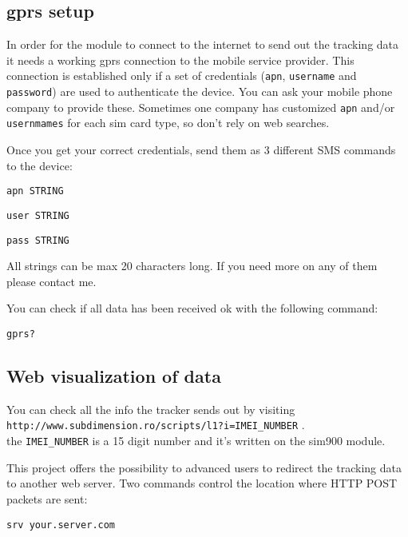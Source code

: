 \documentclass[a4paper,twoside]{refart}
\begin{document}
\subsection{gprs setup}

In order for the module to connect to the internet to send out the tracking data it needs a working gprs connection to the mobile service provider. This connection is established only if a set of credentials (\verb"apn", \verb"username" and \verb"password") are used to authenticate the device. You can ask your mobile phone company to provide these. Sometimes one company has customized \verb"apn" and/or \verb"usernmames" for each sim card type, so don't rely on web searches.

Once you get your correct credentials, send them as 3 different SMS commands to the device:

\begin{lstlisting}
apn STRING
\end{lstlisting}
\begin{lstlisting}
user STRING
\end{lstlisting}
\begin{lstlisting}
pass STRING
\end{lstlisting}

 All strings can be max 20 characters long. If you need more on any of them please contact me.

You can check if all data has been received ok with the following command:

\begin{lstlisting}
gprs?
\end{lstlisting}


\subsection{Web visualization of data}

You can check all the info the tracker sends out by visiting \\ \verb"http://www.subdimension.ro/scripts/l1?i=IMEI_NUMBER" .\\
the \verb"IMEI_NUMBER" is a 15 digit number and it's written on the sim900 module.

This project offers the possibility to advanced users to redirect the tracking data to another web server.
Two commands control the location where HTTP POST packets are sent:

\begin{lstlisting}
srv your.server.com
\end{lstlisting}
\end{document}
